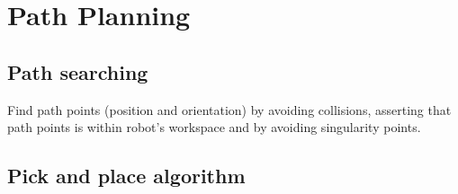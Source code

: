 \section{Path Planning}

\subsection{Path searching} 
Find path points (position and orientation) by avoiding collisions, asserting that path points is within 
robot's workspace and by avoiding singularity points.

\subsection{Pick and place algorithm}
